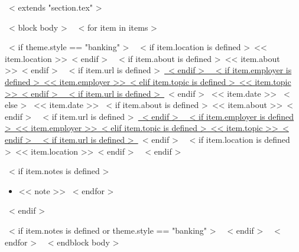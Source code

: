 ~< extends "section.tex" >~

~< block body >~
  ~< for item in items >~
    \begin{samepage}
      \cventry
        ~< if theme.style == "banking" >~
          {~< if item.location is defined >~<< item.location >>~< endif >~}
          {~< if item.about is defined >~<< item.about >>~< endif >~}
          {~< if item.url is defined >~\href{<< item.url >>}{~< endif >~%
             ~< if item.employer is defined >~<< item.employer >>~< elif item.topic is defined >~<< item.topic >>~< endif >~%
           ~< if item.url is defined >~}~< endif >~}
          {<< item.date >>}
        ~< else >~
          {<< item.date >>}
          {~< if item.about is defined >~<< item.about >>~< endif >~}
          {~< if item.url is defined >~\href{<< item.url >>}{~< endif >~%
             ~< if item.employer is defined >~<< item.employer >>~< elif item.topic is defined >~<< item.topic >>~< endif >~%
           ~< if item.url is defined >~}~< endif >~}
          {~< if item.location is defined >~<< item.location >>~< endif >~}
        ~< endif >~
        {}
        {
          ~< if item.notes is defined >~
            \begin{itemize}
              ~< for note in item.notes >~
                \item{<< note >>}
              ~< endfor >~
            \end{itemize}
          ~< endif >~
        }
    \end{samepage}
    ~< if item.notes is defined or theme.style == "banking" >~
      \vspace{10pt}
    ~< endif >~
  ~< endfor >~
  \vspace{-10pt}
~< endblock body >~